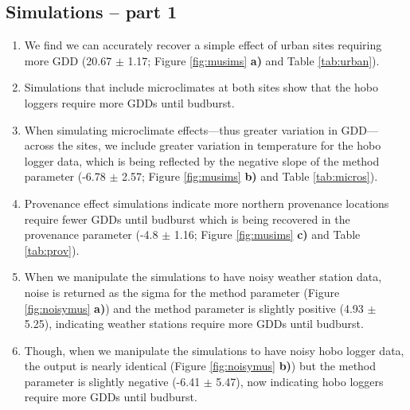 \documentclass{article}\usepackage[]{graphicx}\usepackage[]{color}
\begin{document}
\subsection*{Simulations -- part 1}
\begin{enumerate}
  \item We find we can accurately recover a simple effect of urban sites requiring more GDD (20.67 $\pm$ 1.17; Figure \ref{fig:musims} \textbf{a)} and Table \ref{tab:urban}).
  \item Simulations that include microclimates at both sites show that the hobo loggers require more GDDs until budburst. 
  \item When simulating microclimate effects---thus greater variation in GDD---across the sites, we include greater variation in temperature for the hobo logger data, which is being reflected by the negative slope of the method parameter (-6.78 $\pm$ 2.57; Figure \ref{fig:musims} \textbf{b)} and Table \ref{tab:micros}). 
  \item Provenance effect simulations indicate more northern provenance locations require fewer GDDs until budburst which is being recovered in the provenance parameter (-4.8 $\pm$ 1.16; Figure \ref{fig:musims} \textbf{c)} and Table \ref{tab:prov}).
  \item When we manipulate the simulations to have noisy weather station data, noise is returned as the sigma for the method parameter (Figure \ref{fig:noisymus} \textbf{a)}) and the method parameter is slightly positive (4.93 $\pm$ 5.25), indicating weather stations require more GDDs until budburst. 
  \item Though, when we manipulate the simulations to have noisy hobo logger data, the output is nearly identical (Figure \ref{fig:noisymus} \textbf{b)}) but the method parameter is slightly negative (-6.41 $\pm$ 5.47), now indicating hobo loggers require more GDDs until budburst.
  \end{enumerate}
  
\end{document}
